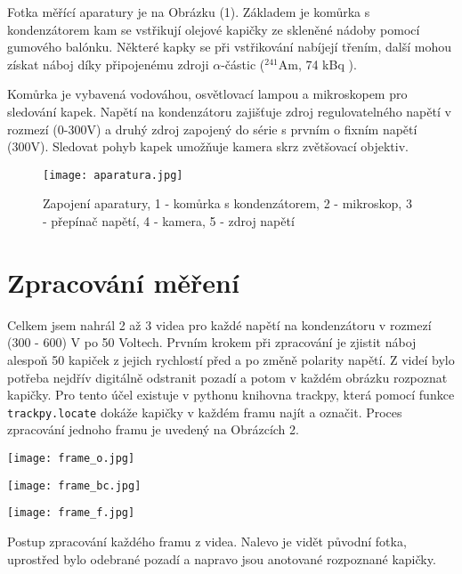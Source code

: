 \documentclass[a4paper,11pt]{article}
\begin{document}
Fotka měřící aparatury je na Obrázku (1). Základem je komůrka s kondenzátorem kam se  vstřikují olejové kapičky ze skleněné nádoby pomocí gumového balónku. Některé kapky se při vstřikování nabíjejí třením, další mohou získat náboj díky připojenému zdroji $ \alpha $-částic  ($ ^{241} $Am, 74 kBq ).

Komůrka je vybavená vodováhou, osvětlovací lampou a mikroskopem pro sledování kapek. Napětí na kondenzátoru zajišťuje zdroj regulovatelného napětí v rozmezí (0-300V) a druhý zdroj zapojený do série s prvním o fixním napětí (300V). Sledovat pohyb kapek umožňuje kamera skrz zvětšovací objektiv. 

\begin{figure}[htpb]
    \centering
    \texttt{[image: aparatura.jpg]}
    \caption{Zapojení aparatury, 1 - komůrka s kondenzátorem, 2 - mikroskop, 3 - přepínač napětí, 4 - kamera, 5 - zdroj napětí}
\end{figure}

\section{Zpracování měření}

Celkem jsem nahrál 2 až 3 videa pro každé napětí na kondenzátoru v rozmezí (300 - 600) V po 50 Voltech. Prvním krokem při zpracování je zjistit náboj alespoň 50 kapiček z jejich rychlostí před a po změně polarity napětí. Z videí bylo potřeba nejdřív digitálně odstranit pozadí a potom v každém obrázku rozpoznat kapičky. Pro tento účel existuje v pythonu knihovna trackpy, která pomocí funkce \texttt{trackpy.locate} dokáže kapičky v každém framu najít a označit. Proces zpracování jednoho framu je uvedený na Obrázcích 2.


\begin{table}[htpb]
    \begin{minipage}{.3\linewidth}
        \centering
        \texttt{[image: frame\_o.jpg]}
    \end{minipage} 
    \hfill
    \begin{minipage}{.3\linewidth}
        \centering
        \texttt{[image: frame\_bc.jpg]}
    \end{minipage} 
    \hfill
    \begin{minipage}{.3\linewidth}
        \centering
        \texttt{[image: frame\_f.jpg]}
    \end{minipage} 
    \hfill
    \captionsetup{type=figure}
    \caption{Postup zpracování každého framu z videa. Nalevo je vidět původní fotka, uprostřed bylo odebrané pozadí a napravo jsou anotované rozpoznané kapičky. }
\end{table}
\end{document}
